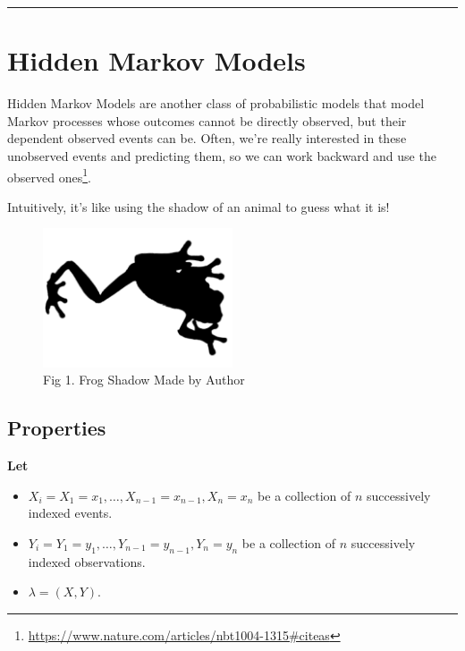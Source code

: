 \documentclass[
]{book}
\providecommand{\tightlist}{%
  \setlength{\itemsep}{0pt}\setlength{\parskip}{0pt}}
\begin{document}
\hfill\break

\begin{center}\rule{0.5\linewidth}{0.5pt}\end{center}

\hypertarget{hidden-markov-models}{%
\section{Hidden Markov Models}\label{hidden-markov-models}}

Hidden Markov Models are another class of probabilistic models that model Markov processes whose outcomes cannot be directly observed, but their dependent observed events can be. Often, we're really interested in these unobserved events and predicting them, so we can work backward and use the observed ones\footnote{\url{https://www.nature.com/articles/nbt1004-1315\#citeas}}.

Intuitively, it's like using the shadow of an animal to guess what it is!

\begin{figure}
\hypertarget{id}{%
\centering
\includegraphics[width=0.5\textwidth,height=0.5\textheight]{images/frogshadow.png}
\caption{Fig 1. Frog Shadow Made by Author}\label{id}
}
\end{figure}

\hfill\break

\hypertarget{properties}{%
\subsection*{Properties}\label{properties}}

\textbf{Let}

\begin{itemize}
\tightlist
\item
  \(X_i = X_1=x_1, \dots, X_{n-1}=x_{n-1}, X_n =x_n\) be a collection of \(n\) successively indexed events.
\item
  \(Y_i = Y_1=y_1, \dots, Y_{n-1}=y_{n-1}, Y_n =y_n\) be a collection of \(n\) successively indexed observations.
\item
  \(\lambda = (X,Y)\).
\end{itemize}
\end{document}
